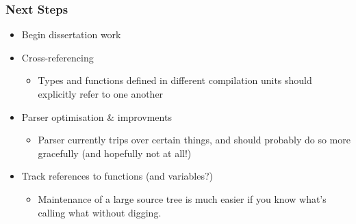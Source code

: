 \documentclass{beamer}
\begin{document}
  \begin{frame}
    \frametitle{Next Steps}
      \begin{itemize}
        \item Begin dissertation work
        \item Cross-referencing
          \begin{itemize}
            \item Types and functions defined in different compilation units
              should explicitly refer to one another
          \end{itemize}
        \item Parser optimisation \& improvments
          \begin{itemize}
            \item Parser currently trips over certain things, and should
              probably do so more gracefully (and hopefully not at all!)
          \end{itemize}
        \item Track references to functions (and variables?)
          \begin{itemize}
            \item Maintenance of a large source tree is much easier if you know
              what's calling what without digging.
          \end{itemize}
      \end{itemize}
  \end{frame}
\end{document}
